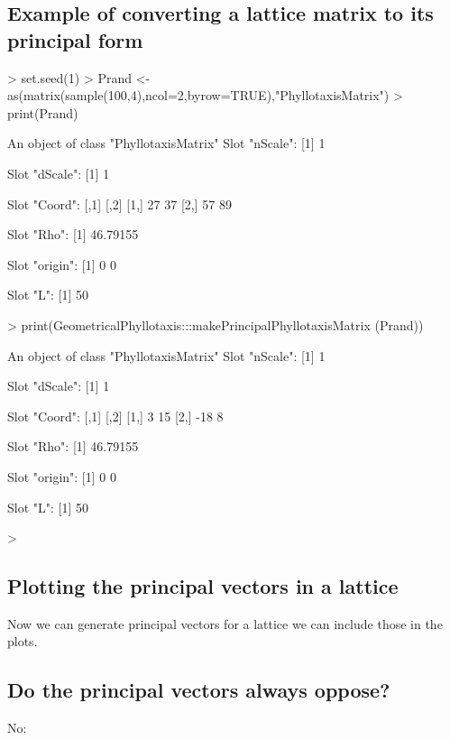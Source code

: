 \documentclass[a4paper]{article}
\begin{document}
\subsection{Example of converting a lattice matrix to its principal form}
\begin{Schunk}
\begin{Sinput}
> set.seed(1)
> Prand <- as(matrix(sample(100,4),ncol=2,byrow=TRUE),"PhyllotaxisMatrix")
> print(Prand)
\end{Sinput}
\begin{Soutput}
An object of class "PhyllotaxisMatrix"
Slot "nScale":
[1] 1

Slot "dScale":
[1] 1

Slot "Coord":
     [,1] [,2]
[1,]   27   37
[2,]   57   89

Slot "Rho":
[1] 46.79155

Slot "origin":
[1] 0 0

Slot "L":
[1] 50
\end{Soutput}
\begin{Sinput}
> print(GeometricalPhyllotaxis:::makePrincipalPhyllotaxisMatrix (Prand))
\end{Sinput}
\begin{Soutput}
An object of class "PhyllotaxisMatrix"
Slot "nScale":
[1] 1

Slot "dScale":
[1] 1

Slot "Coord":
     [,1] [,2]
[1,]    3   15
[2,]  -18    8

Slot "Rho":
[1] 46.79155

Slot "origin":
[1] 0 0

Slot "L":
[1] 50
\end{Soutput}
\begin{Sinput}
> 
\end{Sinput}
\end{Schunk}

\subsection{Plotting the principal vectors in a lattice}
Now we can generate principal vectors for  a lattice we can include those in the plots.

\subsection{Do the principal vectors always oppose?}
No:
\end{document}
